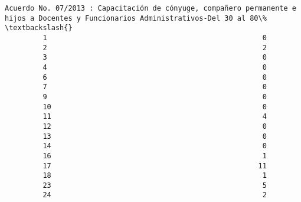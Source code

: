 \documentclass[11pt]{article}
\begin{document}
\begin{Verbatim}[commandchars=\\\{\}]
             Acuerdo No. 07/2013 : Capacitación de cónyuge, compañero permanente e hijos a Docentes y Funcionarios Administrativos-Del 30 al 80\%   \textbackslash{}
         1                                                   0                                                                                      
         2                                                   2                                                                                      
         3                                                   0                                                                                      
         4                                                   0                                                                                      
         6                                                   0                                                                                      
         7                                                   0                                                                                      
         9                                                   0                                                                                      
         10                                                  0                                                                                      
         11                                                  4                                                                                      
         12                                                  0                                                                                      
         13                                                  0                                                                                      
         14                                                  0                                                                                      
         16                                                  1                                                                                      
         17                                                 11                                                                                      
         18                                                  1                                                                                      
         23                                                  5                                                                                      
         24                                                  2                                                                                      

\end{Verbatim}
\end{document}
